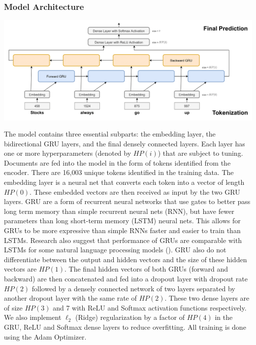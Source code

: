 \documentclass[11pt]{article}
\begin{document}
\subsubsection{Model Architecture}
\includegraphics[width=\textwidth,height=\textheight,keepaspectratio]{architecture.drawio.png}

\noindent The model contains three essential subparts: the embedding layer, the bidirectional GRU layers, and the final densely connected layers. Each layer has one or more hyperparameters (denoted by $HP(i)$) that are subject to tuning. Documents are fed into the model in the form of tokens identified from the encoder. There are 16,003 unique tokens identified in the training data. The embedding layer is a neural net that converts each token into a vector of length $HP(0)$. These embedded vectors are then received as input by the two GRU layers. GRU are a form of recurrent neural networks that use gates to better pass long term memory than simple recurrent neural nets (RNN), but have fewer parameters than long short-term memory (LSTM) neural nets. This allows for GRUs to be more expressive than simple RNNs faster and easier to train than LSTMs. Research also suggest that performance of GRUs are comparable with LSTMs for some natural language processing models (\cite{GRU}). GRU also do not differentiate between the output and hidden vectors and the size of these hidden vectors are $HP(1)$. The final hidden vectors of both GRUs (forward and backward) are then concatenated and fed into a dropout layer with dropout rate $HP(2)$ followed by a densely connected network of two layers separated by another dropout layer with the same rate of $HP(2)$. These two dense layers are of size $HP(3)$ and 7 with ReLU and Softmax activation functions respectively. We also implement $\ell_2$ (Ridge) regularization by a factor of $HP(4)$ in the GRU, ReLU and Softmax dense layers to reduce overfitting. All training is done using the Adam Optimizer.
\end{document}
